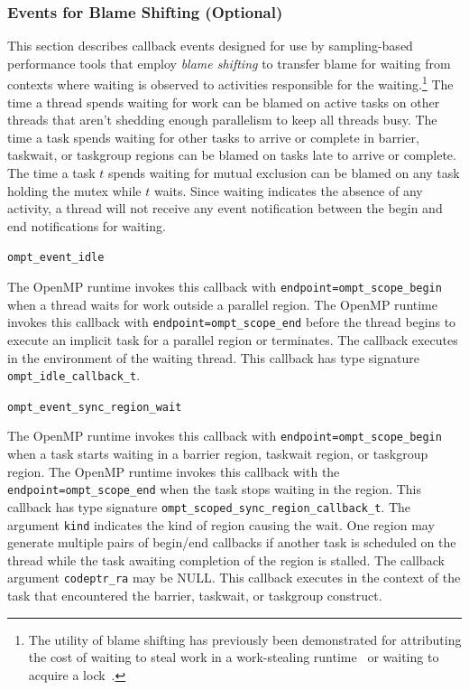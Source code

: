 \documentclass{article}
\begin{document}
\subsubsection{Events for Blame Shifting (Optional)}
\label{sec:blame}
This section describes callback events designed for use by sampling-based performance tools 
that employ {\em blame shifting} to transfer blame for waiting from contexts 
where waiting is observed to activities responsible for the waiting.\footnote{The utility of blame shifting has previously been demonstrated for attributing the cost of waiting to steal work 
in a work-stealing runtime~\cite{Tallent:PPoPP09} or waiting to acquire a lock~\cite{Tallent:PPoPP10}.}
The time a thread spends waiting for work can be blamed on active tasks on other threads that aren't shedding enough parallelism to keep all threads busy. 
The time a task spends waiting for other tasks to arrive or complete in barrier, taskwait, or taskgroup regions can be blamed on tasks late to arrive or complete.
The time a task $t$ spends waiting for mutual exclusion can be blamed on any task holding the mutex while $t$ waits.
Since waiting indicates the absence of any activity, a thread will not receive any event notification between the begin and end notifications for waiting.

\begin{description}

\item \verb|ompt_event_idle|

  \sloppy
  The OpenMP runtime invokes this callback with \verb|endpoint=|\verb|ompt_scope_begin| when a thread waits for work outside a parallel region.
  The OpenMP runtime invokes this callback with \verb|endpoint=|\verb|ompt_scope_end| before the thread  begins to execute an implicit task for
   a parallel region or terminates. The callback executes in the environment of the waiting thread.  
  This callback has type signature \verb|ompt_idle_callback_t|. 

\end{description}

\begin{description}

\item \verb|ompt_event_sync_region_wait|

  The OpenMP runtime invokes this callback with \verb|endpoint=|\verb|ompt_scope_begin| when a task starts waiting in a barrier region, taskwait region, or taskgroup region.
   The OpenMP runtime invokes this callback with the \verb|endpoint=|\verb|ompt_scope_end| when the task stops waiting in the region.
  This callback has type signature \verb|ompt_scoped_sync_region_callback_t|. 
   The argument \verb|kind| indicates the kind of region causing the wait. 
   One region may generate multiple pairs of begin/end callbacks if another task is scheduled on the thread while the task awaiting completion of the region is stalled.
   The callback argument \verb|codeptr_ra| may be NULL.
   This callback executes in the context of the task that encountered the barrier, taskwait, or taskgroup construct. 
   
\end{description}
\end{document}
